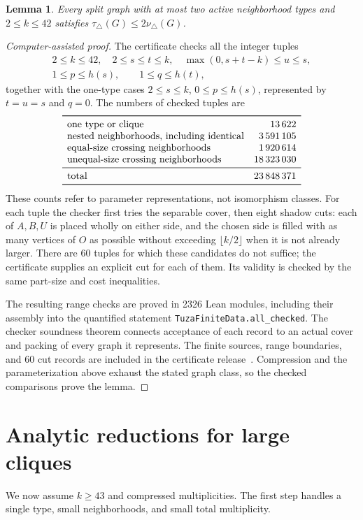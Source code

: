 \documentclass[11pt]{article}
\newtheorem{lemma}[theorem]{Lemma}
\newcommand{\tp}{\nu_{\triangle}}
\newcommand{\tc}{\tau_{\triangle}}
\begin{document}
\begin{lemma}\label{lem:cyclic-finite}
Every split graph with at most two active neighborhood types and
$2\leq k\leq42$ satisfies $\tc(G)\leq2\tp(G)$.
\end{lemma}
\begin{proof}[Computer-assisted proof]
The certificate checks all the integer tuples
\[
\begin{gathered}
2\leq k\leq42,\quad 2\leq s\leq t\leq k,\quad
\max(0,s+t-k)\leq u\leq s,\\
1\leq p\leq h(s),\qquad1\leq q\leq h(t),
\end{gathered}
\]
together with the one-type cases $2\leq s\leq k$, $0\leq p\leq h(s)$,
represented by $t=u=s$ and $q=0$. The numbers of checked tuples are
\[
\begin{array}{lr}
\toprule
\text{one type or clique}&13\,622\\
\text{nested neighborhoods, including identical}&3\,591\,105\\
\text{equal-size crossing neighborhoods}&1\,920\,614\\
\text{unequal-size crossing neighborhoods}&18\,323\,030\\
\midrule
\text{total}&23\,848\,371\\
\bottomrule
\end{array}
\]
These counts refer to parameter representations, not isomorphism classes.
For each tuple the checker first tries the separable cover, then eight
shadow cuts: each of $A,B,U$ is placed wholly on either side, and the
chosen side is filled with as many vertices of $O$ as possible without
exceeding $\lfloor k/2\rfloor$ when it is not already larger.
There are 60 tuples for which these candidates do not suffice; the
certificate supplies an explicit cut for each of them. Its validity
is checked by the same part-size and cost inequalities.

The resulting range checks are proved in 2326 Lean modules, including
their assembly into the quantified statement
\texttt{TuzaFiniteData.all\_checked}. The checker soundness theorem
connects acceptance of each record to an actual cover and packing of
every graph it represents. The finite sources, range boundaries,
and 60 cut records are included in the certificate release~\cite{artifact}.
Compression and the parameterization above exhaust the stated graph
class, so the checked comparisons prove the lemma.
\end{proof}

\section{Analytic reductions for large cliques}\label{sec:analytic}
We now assume $k\geq43$ and compressed multiplicities. The first step
handles a single type, small neighborhoods, and small total multiplicity.
\end{document}
